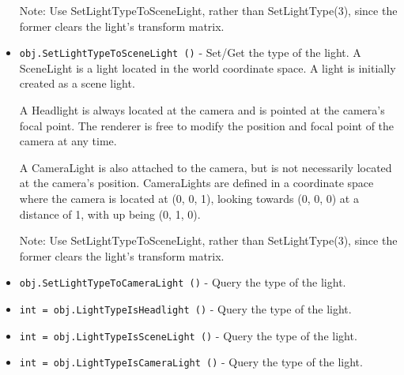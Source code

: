 \begin{itemize}
 Note: Use SetLightTypeToSceneLight, rather than SetLightType(3), since
 the former clears the light's transform matrix.

\item  \verb|obj.SetLightTypeToSceneLight ()| -  Set/Get the type of the light.
 A SceneLight is a light located in the world coordinate space.  A light
 is initially created as a scene light.

 A Headlight is always located at the camera and is pointed at the 
 camera's focal point.  The renderer is free to modify the position and
 focal point of the camera at any time.

 A CameraLight is also attached to the camera, but is not necessarily
 located at the camera's position.  CameraLights are defined in a 
 coordinate space where the camera is located at (0, 0, 1), looking
 towards (0, 0, 0) at a distance of 1, with up being (0, 1, 0).

 Note: Use SetLightTypeToSceneLight, rather than SetLightType(3), since
 the former clears the light's transform matrix.

\item  \verb|obj.SetLightTypeToCameraLight ()| -  Query the type of the light.

\item  \verb|int = obj.LightTypeIsHeadlight ()| -  Query the type of the light.

\item  \verb|int = obj.LightTypeIsSceneLight ()| -  Query the type of the light.

\item  \verb|int = obj.LightTypeIsCameraLight ()| -  Query the type of the light.

\end{itemize}
